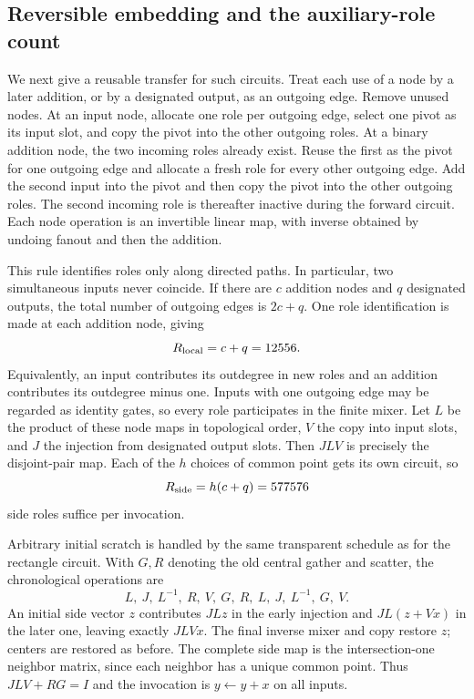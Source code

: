 \subsection{Reversible embedding and the auxiliary-role count}
We next give a reusable transfer for such circuits. Treat each use of a node
by a later addition, or by a designated output, as an outgoing edge. Remove
unused nodes. At an input node, allocate one role per outgoing edge, select
one pivot as its input slot, and copy the pivot into the other outgoing roles.
At a binary addition node, the two incoming roles already exist. Reuse the
first as the pivot for one outgoing edge and allocate a fresh role for every
other outgoing edge. Add the second input into the pivot and then copy the
pivot into the other outgoing roles. The second incoming role is thereafter
inactive during the forward circuit. Each node operation is an invertible
linear map, with inverse obtained by undoing fanout and then the addition.

This rule identifies roles only along directed paths. In particular, two
simultaneous inputs never coincide. If there are $c$ addition nodes and $q$
designated outputs, the total number of outgoing edges is $2c+q$. One role
identification is made at each addition node, giving
\[
 R_{\rm local}=c+q=12556.
\]
Equivalently, an input contributes its outdegree in new roles and an addition
contributes its outdegree minus one. Inputs with one outgoing edge may be
regarded as identity gates, so every role participates in the finite mixer.
Let $L$ be the product of these node maps in topological order, $V$ the copy
into input slots, and $J$ the injection from designated output slots.
Then $JLV$ is precisely the disjoint-pair map. Each of the $h$ choices of
common point gets its own circuit, so
\[
 R_{\rm side}=h(c+q)=577576
\]
side roles suffice per invocation.

Arbitrary initial scratch is handled by the same transparent schedule as for
the rectangle circuit. With $G,R$ denoting the old central gather and scatter,
the chronological operations are
\[
 L,\ J,\ L^{-1},\ R,\ V,\ G,\ R,\ L,\ J,\ L^{-1},\ G,\ V.
\]
An initial side vector $z$ contributes $JLz$ in the early injection and
$JL(z+Vx)$ in the later one, leaving exactly $JLVx$. The final inverse mixer
and copy restore $z$; centers are restored as before. The complete side map
is the intersection-one neighbor matrix, since each neighbor has a unique
common point. Thus $JLV+RG=I$ and the invocation is $y\gets y+x$ on all inputs.

